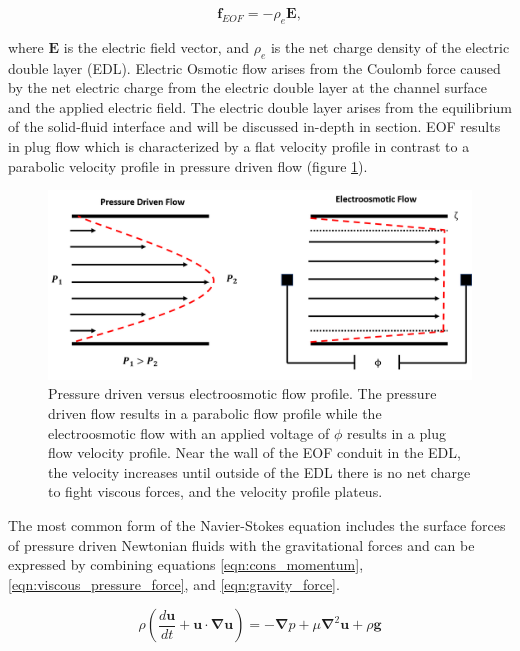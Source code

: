 \begin{equation}
    \textbf{f}_{EOF} = -\rho_e \boldsymbol{E},
\end{equation}

\noindent where $\boldsymbol{E}$ is the electric field vector, and $\rho_e$ is the net charge density of the electric double layer (EDL). Electric Osmotic flow arises from the Coulomb force caused by the net electric charge from the electric double layer at the channel surface and the applied electric field. The electric double layer arises from the equilibrium of the solid-fluid interface and will be discussed in-depth in section. EOF results in plug flow which is characterized by a flat velocity profile in contrast to a parabolic velocity profile in pressure driven flow (figure \ref{fig:plug_vs_parabolic_flow}).

\begin{figure}[ht]
    \centering
    \includegraphics[width = \textwidth]{images/plugVsParabolic.png}
    \caption[Pressure driven versus electroosmotic flow profile]{Pressure driven versus electroosmotic flow profile. The pressure driven flow results in a parabolic flow profile while the electroosmotic flow with an applied voltage of $\phi$ results in a plug flow velocity profile. Near the wall of the EOF conduit in the EDL, the velocity increases until outside of the EDL there is no net charge to fight viscous forces, and the velocity profile plateus.}
    \label{fig:plug_vs_parabolic_flow}
\end{figure}

\par The most common form of the Navier-Stokes equation includes the surface forces of pressure driven Newtonian fluids with the gravitational forces and can be expressed by combining equations \ref{eqn:cons_momentum}, \ref{eqn:viscous_pressure_force}, and \ref{eqn:gravity_force}. 

\begin{equation}
    \rho(\frac{d\textbf{u}}{dt} + \textbf{u}\cdot\boldsymbol{\nabla}\textbf{u}) = -\boldsymbol{\nabla}p + \mu\boldsymbol{\nabla}^2\textbf{u} + \rho \textbf{g}
    \label{eqn:navier_stokes}
\end{equation}

